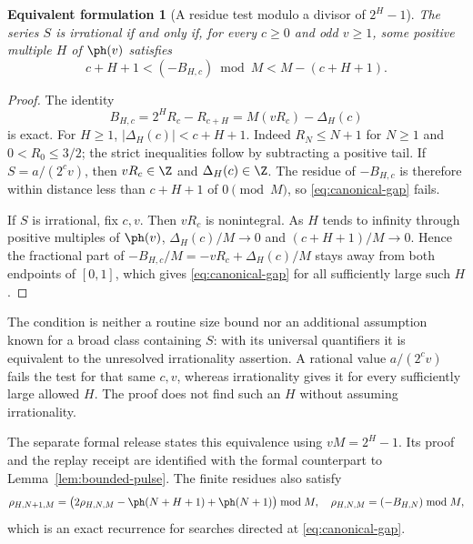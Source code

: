 \documentclass[11pt]{article}
\newtheorem{equivform}[theorem]{Equivalent formulation}
\begin{document}
\begin{equivform}[A residue test modulo a divisor of $2^H-1$]\label{res:canonicalmersenne}
The series $S$ is irrational if and only if, for every $c\ge0$ and odd
$v\ge1$, some positive multiple $H$ of $\ph(v)$ satisfies
\begin{equation}\label{eq:canonical-gap}
 c+H+1<(-B_{H,c})\bmod M<M-(c+H+1).
\end{equation}
\end{equivform}
\begin{proof}
The identity
\[
 B_{H,c}=2^HR_c-R_{c+H}=M(vR_c)-\Delta_H(c)
\]
is exact. For $H\ge1$, $|\Delta_H(c)|<c+H+1$. Indeed $R_N\le N+1$
for $N\ge1$ and $0<R_0\le3/2$; the strict inequalities follow by subtracting
a positive tail. If $S=a/(2^cv)$, then $vR_c\in\Z$ and
$\Delta_H(c)\in\Z$. The residue of $-B_{H,c}$ is therefore within distance
less than $c+H+1$ of $0\pmod M$, so \eqref{eq:canonical-gap} fails.

If $S$ is irrational, fix $c,v$. Then $vR_c$ is nonintegral. As $H$ tends
to infinity through positive multiples of $\ph(v)$,
$\Delta_H(c)/M\to0$ and $(c+H+1)/M\to0$. Hence the fractional part of
$-B_{H,c}/M=-vR_c+\Delta_H(c)/M$ stays away from both endpoints of $[0,1]$,
which gives \eqref{eq:canonical-gap} for all sufficiently large such $H$.
\end{proof}
The condition is neither a routine size bound nor an additional assumption
known for a broad class containing $S$: with its universal quantifiers it
is equivalent to the unresolved irrationality assertion. A rational value
$a/(2^cv)$ fails the test for that same $c,v$, whereas irrationality gives
it for every sufficiently large allowed $H$. The proof does not find such
an $H$ without assuming irrationality.

The separate formal release states this equivalence using $vM=2^H-1$.
Its proof and the replay receipt are identified with the formal counterpart
to Lemma~\ref{lem:bounded-pulse}.
The finite residues also satisfy
\[
 \rho_{H,N+1,M}=
 \bigl(2\rho_{H,N,M}-\ph(N+H+1)+\ph(N+1)\bigr)\bmod M,
 \quad \rho_{H,N,M}=(-B_{H,N})\bmod M,
\]
which is an exact recurrence for searches directed at \eqref{eq:canonical-gap}.
\end{document}
